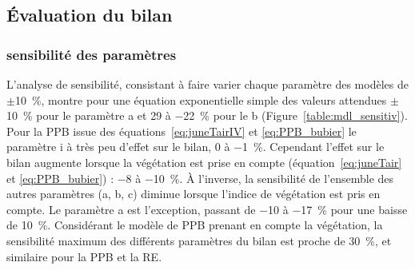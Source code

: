 \subsection{Évaluation du bilan}

\subsubsection{sensibilité des paramètres}

L'analyse de sensibilité, consistant à faire varier chaque paramètre des modèles de $\pm$\SI{10}{\percent}, montre pour une équation exponentielle simple des valeurs attendues $\pm$\SI{10}{\percent} pour le paramètre a et \num{+29} à \SI{-22}{\percent} pour le b (Figure~\ref{table:mdl_sensitiv}).
Pour la PPB issue des équations~\ref{eq:juneTairIV} et \ref{eq:PPB_bubier} le paramètre i à très peu d'effet sur le bilan, \num{0} à \SI{-1}{\percent}.
Cependant l'effet sur le bilan augmente lorsque la végétation est prise en compte (équation~\ref{eq:juneTair} et \ref{eq:PPB_bubier}) : \num{-8} à \SI{-10}{\percent}.
À l'inverse, la sensibilité de l'ensemble des autres paramètres (a, b, c) diminue lorsque l'indice de végétation est pris en compte.
Le paramètre a est l'exception, passant de \num{-10} à \SI{-17}{\percent} pour une baisse de \SI{10}{\percent}.
Considérant le modèle de PPB prenant en compte la végétation, la sensibilité maximum des différents paramètres du bilan est proche de \SI{30}{\percent}, et similaire pour la PPB et la RE.

